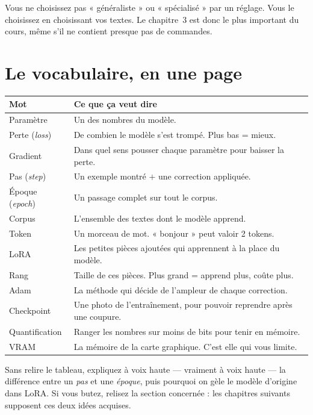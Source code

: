 \begin{nkretenir}
Vous ne choisissez pas « généraliste » ou « spécialisé » par un réglage. Vous le
choisissez en choisissant vos textes. Le chapitre~3 est donc le plus important
du cours, même s'il ne contient presque pas de commandes.
\end{nkretenir}

\section{Le vocabulaire, en une page}

\begin{center}
\begin{longtable}{p{3.6cm}p{10.4cm}}
\toprule
\textbf{Mot} & \textbf{Ce que ça veut dire} \\
\midrule
\endhead
Paramètre & Un des nombres du modèle. \\
Perte (\emph{loss}) & De combien le modèle s'est trompé. Plus bas = mieux. \\
Gradient & Dans quel sens pousser chaque paramètre pour baisser la perte. \\
Pas (\emph{step}) & Un exemple montré $+$ une correction appliquée. \\
Époque (\emph{epoch}) & Un passage complet sur tout le corpus. \\
Corpus & L'ensemble des textes dont le modèle apprend. \\
Token & Un morceau de mot. « bonjour » peut valoir 2 tokens. \\
LoRA & Les petites pièces ajoutées qui apprennent à la place du modèle. \\
Rang & Taille de ces pièces. Plus grand = apprend plus, coûte plus. \\
Adam & La méthode qui décide de l'ampleur de chaque correction. \\
Checkpoint & Une photo de l'entraînement, pour pouvoir reprendre après une coupure. \\
Quantification & Ranger les nombres sur moins de bits pour tenir en mémoire. \\
VRAM & La mémoire de la carte graphique. C'est elle qui vous limite. \\
\bottomrule
\end{longtable}
\end{center}

\begin{nkexo}
Sans relire le tableau, expliquez à voix haute — vraiment à voix haute — la
différence entre un \emph{pas} et une \emph{époque}, puis pourquoi on gèle le
modèle d'origine dans LoRA. Si vous butez, relisez la section concernée : les
chapitres suivants supposent ces deux idées acquises.
\end{nkexo}
